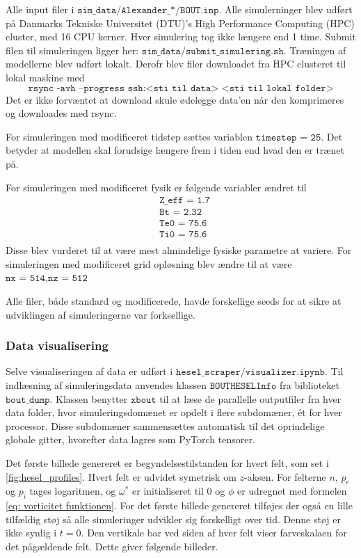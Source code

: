 Alle input filer i $\texttt{sim\_data/Alexander\_*/BOUT.inp}$.
Alle simulerninger blev udført på Danmarks Tekniske Universitet (DTU)'s High Performance Computing (HPC) cluster, med 16 CPU kerner.
Hver simulering tog ikke længere end 1 time.
Submit filen til simuleringen ligger her: $\texttt{sim\_data/submit\_simulering.sh}$.
Træningen af modellerne blev udført lokalt. Derofr blev filer downloadet fra HPC clusteret til lokal maskine med 
\[
    \texttt{rsync -avh --progress ssh:<sti til data> <sti til lokal folder>}
\]
Det er ikke forvæntet at download skule ødelegge data'en når den komprimeres og downloades med rsync.




For simuleringen med modificeret tidstep sættes variablen $\texttt{timestep = 25}$. Det betyder at modellen skal forudsige længere frem
i tiden end hvad den er trænet på.

For simuleringen med modificeret fysik er følgende variabler ændret til
\begin{align*}
    &\texttt{Z\_eff  = 1.7} \\
    &\texttt{Bt      = 2.32} \\
    &\texttt{Te0     = 75.6} \\
    &\texttt{Ti0     = 75.6} \\
\end{align*}
Disse blev vurderet til at være mest almindelige fysiske parametre at variere.
For simuleringen med modificeret grid opløsning blev ændre til at være $\texttt{nx = 514}, \texttt{nz = 512}$

Alle filer, både standard og modificerede, havde forskellige seeds for at sikre at udviklingen af simuleringerne var forksellige.


\subsubsection{Data visualisering}
Selve visualiseringen af data er udført i $\texttt{hesel\_scraper/visualizer.ipynb}$.
Til indlæsning af simuleringsdata anvendes klassen $\texttt{BOUTHESELInfo}$ fra biblioteket $\texttt{bout\_dump}$.
Klassen benytter $\texttt{xbout}$ til at læse de parallelle outputfiler fra hver data folder, hvor simuleringsdomænet er opdelt i flere subdomæner,
ét for hver processor. Disse subdomæner sammensættes automatisk til det oprindelige globale gitter, hvorefter data lagres som PyTorch tensorer.

Det første billede genereret er begyndelsestilstanden for hvert felt, som set i \ref{fig:hesel_profiles}. Hvert felt er udvidet symetrisk om $z$-aksen.
For felterne $n$, $p_e$ og $p_i$ tages logaritmen, og $\omega^*$ er initialiseret til 0 og $\phi$ er udregnet med formelen \eqref{eq: vorticitet funktionen}.
For det første billede genereret tilføjes der også en lille tilfældig støj så alle simuleringer udvikler sig forskelligt over tid. Denne støj er ikke synlig i $t=0$.
Den vertikale bar ved siden af hver felt viser farveskalaen for det pågældende felt.
Dette giver følgende billeder.

